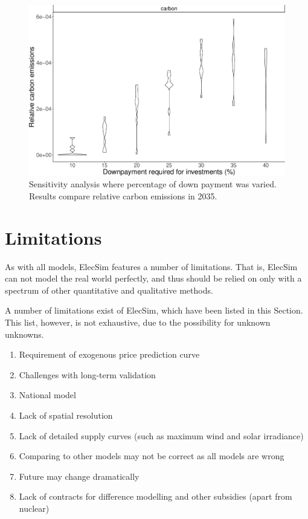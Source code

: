 \begin{figure}
	\centering
	\includegraphics[width=0.9\linewidth]{Chapter4/figures/sensitvity_analysis/downpayment_carbon_sensitivity_analysis.pdf}
	\caption{Sensitivity analysis where percentage of down payment was varied. Results compare relative carbon emissions in 2035.}
	\label{elecsim:fig:downpayment_carbon_sensitivity}
\end{figure}


\section{Limitations}
\label{elecsim:sec:limitations}

As with all models, ElecSim features a number of limitations. That is, ElecSim can not model the real world perfectly, and thus should be relied on only with a spectrum of other quantitative and qualitative methods. 

A number of limitations exist of ElecSim, which have been listed in this Section. This list, however, is not exhaustive, due to the possibility for unknown unknowns.

\begin{enumerate}
	\item Requirement of exogenous price prediction curve
	\item Challenges with long-term validation
	\item National model
	\item Lack of spatial resolution
	\item Lack of detailed supply curves (such as maximum wind and solar irradiance)
	\item Comparing to other models may not be correct as all models are wrong
	\item Future may change dramatically
	\item Lack of contracts for difference modelling and other subsidies (apart from nuclear)
\end{enumerate}

